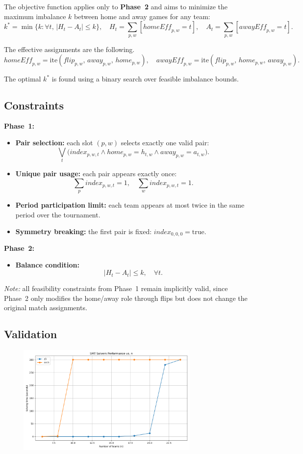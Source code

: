 The objective function applies only to \textbf{Phase~2} and aims to minimize the maximum imbalance $k$ between home and away games for any team:
\[
k^* = \min \{ k : \forall t,\, |H_t - A_t| \leq k \},
\quad H_t = \sum_{p,w} [\mathit{homeEff}_{p,w} = t], \quad
A_t = \sum_{p,w} [\mathit{awayEff}_{p,w} = t].
\]

The effective assignments are the following.
\[
\mathit{homeEff}_{p,w} = \text{ite}(\mathit{flip}_{p,w},\, \mathit{away}_{p,w},\, \mathit{home}_{p,w}), \quad
\mathit{awayEff}_{p,w} = \text{ite}(\mathit{flip}_{p,w},\, \mathit{home}_{p,w},\, \mathit{away}_{p,w}).
\]

The optimal $k^*$ is found using a binary search over feasible imbalance bounds.

\subsection{Constraints}

\textbf{Phase~1:}
\begin{itemize}
    \item \textbf{Pair selection:} each slot $(p,w)$ selects exactly one valid pair:
    \[
    \bigvee_{t} \Big(
        \mathit{index}_{p,w,t} \wedge
        \mathit{home}_{p,w} = h_{t,w} \wedge
        \mathit{away}_{p,w} = a_{t,w}
    \Big).
    \]
    \item \textbf{Unique pair usage:} each pair appears exactly once:
    \[
    \sum_{p} \mathit{index}_{p,w,t} = 1, \quad \sum_{w} \mathit{index}_{p,w,t} = 1.
    \]
    \item \textbf{Period participation limit:} each team appears at most twice in the same period over the tournament.
    \item \textbf{Symmetry breaking:} the first pair is fixed: $\mathit{index}_{0,0,0} = \text{true}$.
\end{itemize}

\textbf{Phase~2:}
\begin{itemize}
    \item \textbf{Balance condition:}
    \[
    |H_t - A_t| \leq k, \quad \forall t.
    \]
\end{itemize}
\textit{Note:} all feasibility constraints from Phase~1 remain implicitly valid, since Phase~2 only modifies the home/away role through flips but does not change the original match assignments.


\subsection{Validation}
\begin{figure}[h!]
  \centering
  \includegraphics[width=0.8\textwidth]{img/SMT-result.png}
  \caption{}
  \label{fig:output}
\end{figure}